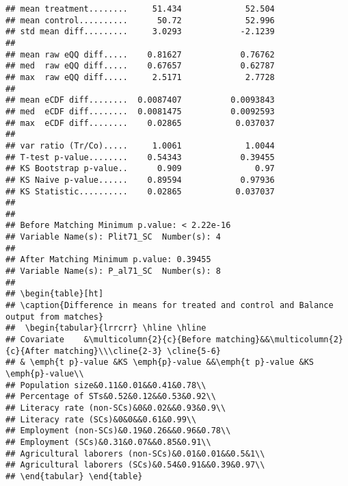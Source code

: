 \documentclass[
]{article}
\begin{document}
\begin{verbatim}
## mean treatment........     51.434             52.504 
## mean control..........      50.72             52.996 
## std mean diff.........     3.0293            -2.1239 
## 
## mean raw eQQ diff.....    0.81627            0.76762 
## med  raw eQQ diff.....    0.67657            0.62787 
## max  raw eQQ diff.....     2.5171             2.7728 
## 
## mean eCDF diff........  0.0087407          0.0093843 
## med  eCDF diff........  0.0081475          0.0092593 
## max  eCDF diff........    0.02865           0.037037 
## 
## var ratio (Tr/Co).....     1.0061             1.0044 
## T-test p-value........    0.54343            0.39455 
## KS Bootstrap p-value..      0.909               0.97 
## KS Naive p-value......    0.89594            0.97936 
## KS Statistic..........    0.02865           0.037037 
## 
## 
## Before Matching Minimum p.value: < 2.22e-16 
## Variable Name(s): Plit71_SC  Number(s): 4 
## 
## After Matching Minimum p.value: 0.39455 
## Variable Name(s): P_al71_SC  Number(s): 8 
## 
## \begin{table}[ht] 
## \caption{Difference in means for treated and control and Balance output from matches} 
##  \begin{tabular}{lrrcrr} \hline \hline 
## Covariate    &\multicolumn{2}{c}{Before matching}&&\multicolumn{2}{c}{After matching}\\\cline{2-3} \cline{5-6} 
## & \emph{t p}-value &KS \emph{p}-value &&\emph{t p}-value &KS \emph{p}-value\\
## Population size&0.11&0.01&&0.41&0.78\\
## Percentage of STs&0.52&0.12&&0.53&0.92\\
## Literacy rate (non-SCs)&0&0.02&&0.93&0.9\\
## Literacy rate (SCs)&0&0&&0.61&0.99\\
## Employment (non-SCs)&0.19&0.26&&0.96&0.78\\
## Employment (SCs)&0.31&0.07&&0.85&0.91\\
## Agricultural laborers (non-SCs)&0.01&0.01&&0.5&1\\
## Agricultural laborers (SCs)&0.54&0.91&&0.39&0.97\\
## \end{tabular} \end{table}
\end{verbatim}
\end{document}
